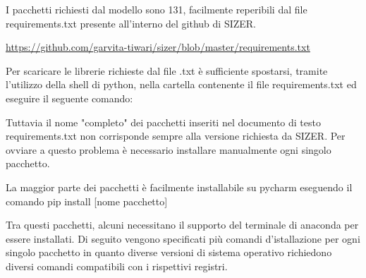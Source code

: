 I pacchetti richiesti dal modello sono 131, facilmente reperibili dal file requirements.txt presente all'interno del github di SIZER. 

\medskip

\url{https://github.com/garvita-tiwari/sizer/blob/master/requirements.txt}

\medskip

Per scaricare le librerie richieste dal file .txt è sufficiente spostarsi, tramite l'utilizzo della shell di python, nella cartella contenente il file requirements.txt ed eseguire il seguente comando:

\medskip


\medskip

Tuttavia il nome "completo" dei pacchetti inseriti nel documento di testo requirements.txt non corrisponde sempre alla versione richiesta da SIZER.
Per ovviare a questo problema è necessario installare manualmente ogni singolo pacchetto.


\medskip

La maggior parte dei pacchetti è facilmente installabile su pycharm eseguendo il comando pip install [nome pacchetto]

\medskip

Tra questi pacchetti, alcuni necessitano il supporto del terminale di anaconda per essere installati.
Di seguito vengono specificati più comandi d'istallazione per ogni singolo pacchetto in quanto diverse versioni di sistema operativo richiedono diversi comandi compatibili con i rispettivi registri.

\newpage

